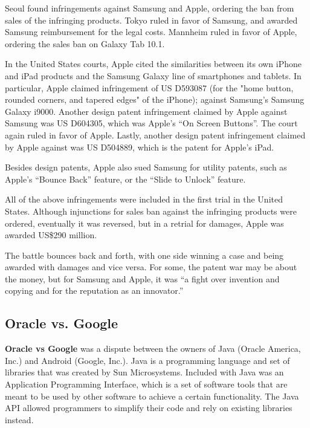 \documentclass[prodmode,cs196]{acmlarge}
\begin{document}
Seoul found infringements against Samsung and Apple, ordering the ban from sales of the infringing products. Tokyo ruled in favor of Samsung, and awarded Samsung reimbursement for the legal costs. Mannheim ruled in favor of Apple, ordering the sales ban on Galaxy Tab 10.1.

In the United States courts, Apple cited the similarities between its own iPhone and iPad products and the Samsung Galaxy line of smartphones and tablets. In particular, Apple claimed infringement of US D593087 (for the "home button, rounded corners, and tapered edges" of the iPhone); \cite{AppleiPhoneDesignPatent} against Samsung’s Samsung Galaxy i9000. Another design patent infringement claimed by Apple against Samsung was US D604305, which was Apple’s “On Screen Buttons”. \cite{anzures2009graphical} The court again ruled in favor of Apple. Lastly, another design patent infringement claimed by Apple against was US D504889, which is the patent for Apple’s iPad. \cite{andre2005electronic}

Besides design patents, Apple also sued Samsung for utility patents, such as Apple’s “Bounce Back” feature, or the “Slide to Unlock” feature.

All of the above infringements were included in the first trial in the United States. Although injunctions for sales ban against the infringing products were ordered, eventually it was reversed, but in a retrial for damages, Apple was awarded US\$290 million.

The battle bounces back and forth, with one side winning a case and being awarded with damages and vice versa. For some, the patent war may be about the money, but for Samsung and Apple, it was “a fight over invention and copying and for the reputation as an innovator.” \cite{CNet}

\subsection{Oracle vs. Google}

\textbf{Oracle vs Google} was a dispute between the owners of Java (Oracle America, Inc.) and Android (Google, Inc.). Java is a programming language and set of libraries that was created by Sun Microsystems. Included with Java was an Application Programming Interface, which is a set of software tools that are meant to be used by other software to achieve a certain functionality. \cite{Sintes2001} The Java API allowed programmers to simplify their code and rely on existing libraries instead.
\end{document}
